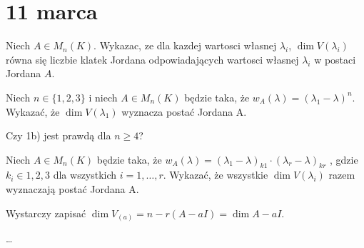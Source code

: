 \documentclass[11pt]{scrartcl}
\begin{document}
  \section{11 marca}
      \begin{zadanie}
          \begin{walk}
              \item Niech $A \in M_n(K)$. Wykazac, ze dla kazdej wartosci własnej $\lambda_i$, $\dim V( \lambda_i )$ równa się liczbie klatek Jordana odpowiadających wartosci własnej $\lambda_i$ w postaci Jordana $A$.
              \item Niech $n \in \{1, 2, 3\}$ i niech $A \in M_n(K)$ będzie taka, że $w_A(\lambda) = (\lambda_{1} - \lambda)^n$. Wykazać, że $\dim V(\lambda_{1})$ wyznacza postać Jordana A.
              \item Czy 1b) jest prawdą dla $n \geq 4$?
              \item Niech $A \in M_n(K)$ będzie taka, że $w_A(\lambda) = (\lambda_{1} - \lambda)_{k1} \cdot  (\lambda_r - \lambda)_{kr}$ , gdzie $k_i \in {1, 2, 3}$ dla wszystkich $i = 1, \dots  , r$. Wykazać, że wszystkie $\dim V(\lambda_i )$ razem wyznaczają postać Jordana A.
          \end{walk}
          
      \end{zadanie}

      \begin{walk}
      \item Wystarczy zapisać $\dim V_{(a)} = n - r(A - aI) = \dim A - aI$.
      \item \dots 
      \end{walk}
    
\end{document}
